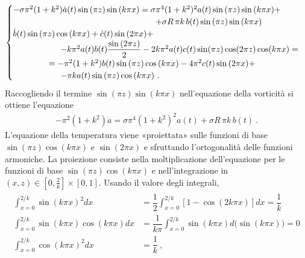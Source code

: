 \documentclass[letterpaper,10pt,italian]{jupyterBook}
\begin{document}
\begin{equation*}
\begin{split}\begin{cases}
- \sigma \pi^2 (1+k^2) \dot{a}(t) \sin{(\pi z)} \sin{(k\pi x )} = \sigma \pi^4 (1+k^2)^2 a(t) \sin{(\pi z)} \sin{(k \pi x)} + \\
      \hspace{6.0cm} + \sigma R \, \pi k \, b(t) \sin{(\pi z)}\sin{(k \pi x)} \\
     \dot{b}(t)\sin{(\pi z)} \cos{(k\pi x )} + \dot{c}(t) \sin{(2\pi x)} + \\
     \hspace{2.0cm} - k \pi^2 a(t) b(t) \dfrac{\sin{(2 \pi z)}}{2} -
    2 k \pi^2 a(t)c(t) \sin(\pi z) \cos(2\pi z) \cos(k \pi x) = \\ 
    \hspace{1.5cm} = -\pi^2 (1+k^2) b(t) \sin{(\pi z)}\cos{(k \pi x)} - 4 \pi^2 c(t) \sin{(2\pi x)} + \\
    \hspace{2.0cm} - \pi k a(t) \sin{(\pi z)} \cos{(k \pi x)} \ .
    \end{cases}\end{split}
\end{equation*}
\sphinxAtStartPar
Raccogliendo il termine
\(\sin{(\pi z)} \sin{(k \pi x)}\) nell’equazione della vorticità si
ottiene l’equazione
\begin{equation*}
\begin{split}- \pi^2 (1+k^2) \dot{a} = \sigma \pi^4 (1+k^2)^2 a(t) +  \sigma R \, \pi k \, b(t) \ .\end{split}
\end{equation*}
\sphinxAtStartPar
L’equazione della temperatura viene «proiettata» sulle funzioni di base
\(\sin{(\pi z)} \cos{(k \pi x)}\) e \(\sin{(2 \pi x)}\) e sfruttando
l’ortogonalità delle funzioni armoniche. La proiezione consiste nella
moltiplicazione dell’equazione per le funzioni di base
\(\sin{(\pi z)} \cos{(k \pi x)}\) e nell’integrazione in
\((x,z) \in \left[0,\frac{2}{k}\right]\times\left[0,1\right]\). Usando il
valore degli integrali,
\begin{equation*}
\begin{split}\begin{aligned}
 \int_{x=0}^{2/k} \sin{(k \pi x)}^2 dx & = \dfrac{1}{2} \int_{x=0}^{2/k} \left[ 1 - \cos{(2 k \pi x)} \right] dx = \dfrac{1}{k} \\
 \int_{x=0}^{2/k} \sin{(k \pi x)}\cos{(k \pi x)} dx & = \dfrac{1}{k \pi} \int_{x=0}^{2/k} \sin{(k \pi x)} d \big( \sin{(k \pi x)} \big) = 0 \\
 \int_{x=0}^{2/k} \cos{(k \pi x)}^2 dx & = \dfrac{1}{k} \ ,
\end{aligned}\end{split}
\end{equation*}
\end{document}
